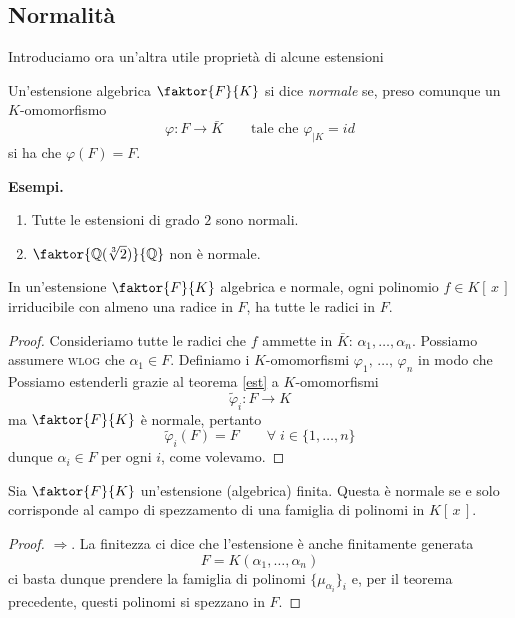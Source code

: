 \subsection{Normalità}
\begin{multicols}{2}
Introduciamo ora un'altra utile proprietà di alcune estensioni

\begin{definition}[Normalità]
	Un'estensione algebrica $ \faktor{F}{K} $ si dice \emph{normale} se, preso comunque un $ K $-omomorfismo
	\[ \varphi \colon F \to \bar{K} \qquad\text{tale che } \varphi_{|K} = id \]
	si ha che $ \varphi(F) = F $.
\end{definition}

\textbf{Esempi.}
\begin{enumerate}
	\item Tutte le estensioni di grado $ 2 $ sono normali.
	\item $ \faktor{\Q(\sqrt[3]{2})}{\Q} $ non è normale.
\end{enumerate}

\begin{theorem}
	In un'estensione $ \faktor{F}{K} $ algebrica e normale, ogni polinomio $ f \in K[\,x\,] $ irriducibile con almeno una radice in $ F $, ha tutte le radici in $ F $.
\end{theorem}
\begin{proof}
	Consideriamo tutte le radici che $ f $ ammette in $ \bar{K} $: $ \alpha_1, \dots, \alpha_n $. Possiamo assumere \textsc{wlog} che $ \alpha_1 \in F $. Definiamo i $ K $-omomorfismi $ \varphi_1,\, \dots,\, \varphi_n $ in modo che
	Possiamo estenderli grazie al teorema \ref{est} a $ K $-omomorfismi
	\[ \tilde{\varphi}_i \colon F \to K \] 
	ma $ \faktor{F}{K} $ è normale, pertanto 
	$$  \tilde{\varphi}_i(F) = F \qquad\forall \; i \in \{1, \dots, n\} $$
	dunque $ \alpha_i \in F $ per ogni $ i $, come volevamo.
	
\end{proof}

\begin{theorem}\label{carnorm}
	Sia $ \faktor{F}{K} $ un'estensione (algebrica) finita. Questa è normale se e solo corrisponde al campo di spezzamento di una famiglia di polinomi in $ K[\,x\,] $.
\end{theorem}
\begin{proof}
	$ \Rightarrow$. La finitezza ci dice che l'estensione è anche finitamente generata
	 \[ F = K(\alpha_1, \dots, \alpha_n ) \]
	ci basta dunque prendere la famiglia di polinomi $ \{\mu_{\alpha_i} \}_{i} $ e, per il teorema precedente, questi polinomi si spezzano in $ F $.
	

\end{proof}
\end{multicols}
